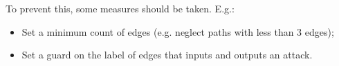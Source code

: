 \documentclass{ou-report}
\begin{document}
To prevent this, some measures should be taken. E.g.:
\begin{itemize}
    \item Set a minimum count of edges (e.g. neglect paths with less than 3 edges);
    \item Set a guard on the label of edges that inputs and outputs an attack.
\end{itemize}


% 
%  
%  









\end{document}
